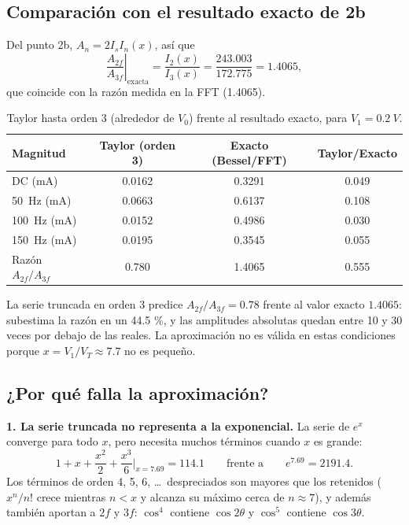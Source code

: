 \documentclass{article}
\newcommand{\VT}{V_T}
\begin{document}
\subsection*{Comparación con el resultado exacto de 2b}

Del punto 2b, $A_n=2I_sI_n(x)$, así que
\[
\left.\frac{A_{2f}}{A_{3f}}\right|_{\text{exacta}}=\frac{I_2(x)}{I_3(x)}=\frac{243.003}{172.775}=1.4065,
\]
que coincide con la razón medida en la FFT (1.4065).

\begin{table}[H]
\centering
\caption{Taylor hasta orden 3 (alrededor de $V_0$) frente al resultado exacto, para $V_1=\SI{0.2}{V}$.}
\label{tab:3}
\begin{tabular}{@{}lccc@{}}
\toprule
Magnitud & Taylor (orden 3) & Exacto (Bessel/FFT) & Taylor/Exacto \\
\midrule
DC (mA)             & 0.0162 & 0.3291 & 0.049 \\
\SI{50}{Hz} (mA)    & 0.0663 & 0.6137 & 0.108 \\
\SI{100}{Hz} (mA)   & 0.0152 & 0.4986 & 0.030 \\
\SI{150}{Hz} (mA)   & 0.0195 & 0.3545 & 0.055 \\
\midrule
Razón $A_{2f}/A_{3f}$ & 0.780 & 1.4065 & 0.555 \\
\bottomrule
\end{tabular}
\end{table}

La serie truncada en orden 3 predice $A_{2f}/A_{3f}=0.78$ frente al valor exacto $1.4065$: subestima
la razón en un 44.5 \%, y las amplitudes absolutas quedan entre 10 y 30 veces por debajo de las reales.
La aproximación no es válida en estas condiciones porque $x=V_1/\VT\approx7.7$ no es pequeño.

\subsection*{¿Por qué falla la aproximación?}

\textbf{1. La serie truncada no representa a la exponencial.} La serie de $e^x$ converge para todo $x$,
pero necesita muchos términos cuando $x$ es grande:
\[
1+x+\frac{x^2}{2}+\frac{x^3}{6}\bigg|_{x=7.69}=114.1\qquad\text{frente a}\qquad e^{7.69}=2191.4 .
\]
Los términos de orden 4, 5, 6, \ldots\ despreciados son mayores que los retenidos ($x^n/n!$ crece
mientras $n<x$ y alcanza su máximo cerca de $n\approx7$), y además también aportan a $2f$ y $3f$:
$\cos^4$ contiene $\cos2\theta$ y $\cos^5$ contiene $\cos3\theta$.
\end{document}
